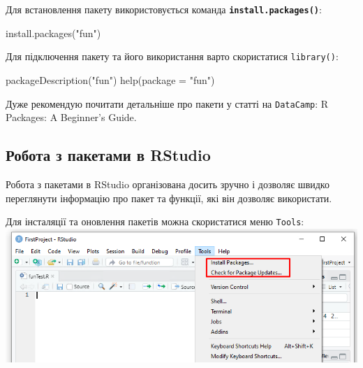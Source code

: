 \documentclass[
]{book}
\newenvironment{Shaded}{\begin{snugshade}}{\end{snugshade}}
\newcommand{\AttributeTok}[1]{\textcolor[rgb]{0.77,0.63,0.00}{#1}}
\newcommand{\FunctionTok}[1]{\textcolor[rgb]{0.00,0.00,0.00}{#1}}
\newcommand{\NormalTok}[1]{#1}
\newcommand{\StringTok}[1]{\textcolor[rgb]{0.31,0.60,0.02}{#1}}
\begin{document}
Для встановлення пакету використовується команда \textbf{\texttt{install.packages()}}:

\begin{Shaded}
\begin{Highlighting}[]
\FunctionTok{install.packages}\NormalTok{(}\StringTok{"fun"}\NormalTok{)}
\end{Highlighting}
\end{Shaded}

Для підключення пакету та його використання варто скористатися \texttt{library()}:

\begin{Shaded}
\begin{Highlighting}[]
\FunctionTok{packageDescription}\NormalTok{(}\StringTok{"fun"}\NormalTok{)}
\FunctionTok{help}\NormalTok{(}\AttributeTok{package =} \StringTok{"fun"}\NormalTok{)}
\end{Highlighting}
\end{Shaded}

Дуже рекомендую почитати детальніше про пакети у статті на \texttt{DataCamp}:
R Packages: A Beginner's Guide.

\hypertarget{chapter142}{%
\subsection{Робота з пакетами в RStudio}\label{chapter142}}

Робота з пакетами в RStudio організована досить зручно і дозволяє швидко переглянути інформацію про пакет та функції, які він дозволяє використати.

Для інсталяції та оновлення пакетів можна скористатися меню \texttt{Tools}:
\includegraphics{images/chapter1/packages_1.png}
\end{document}
